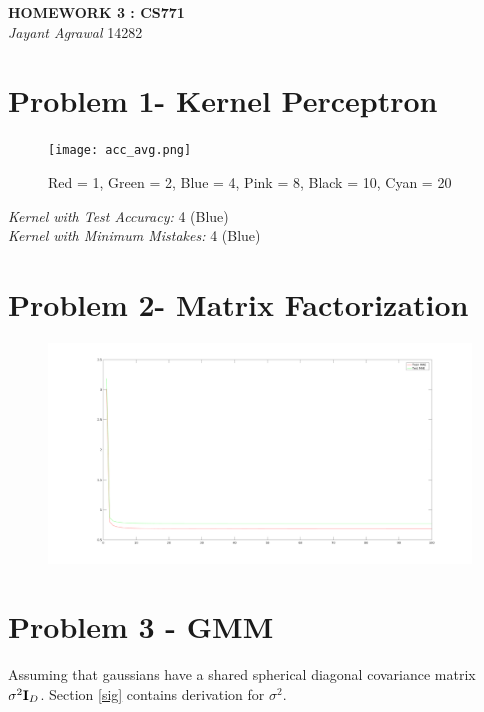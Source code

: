 \documentclass{article}
\begin{document}

\begin{center}
\textbf{\Large HOMEWORK 3 : CS771} \\
\textit{\large Jayant Agrawal}         14282
\end{center}
\section{Problem 1- Kernel Perceptron}
\begin{figure}[h!]
\centering
\texttt{[image: acc\_avg.png]}
\caption{Red = 1, Green = 2, Blue = 4, Pink = 8, Black = 10, Cyan = 20}
\label{acc}
\end{figure}
\begin{center}
\emph{Kernel with Test Accuracy: }4 (Blue)\\ 
\emph{Kernel with Minimum Mistakes: }4 (Blue) 
\end{center}

\section{Problem 2- Matrix Factorization}
\begin{figure}[h!]
\centering
\includegraphics[width=1\columnwidth]{mae2.png}
\label{mae}
\end{figure}

\section{Problem 3 - GMM }
Assuming that gaussians have a shared spherical diagonal covariance matrix $\sigma^2\text{\textbf{I}}_D$.  Section \ref{sig} contains derivation for $\sigma^2$.
\end{document}
